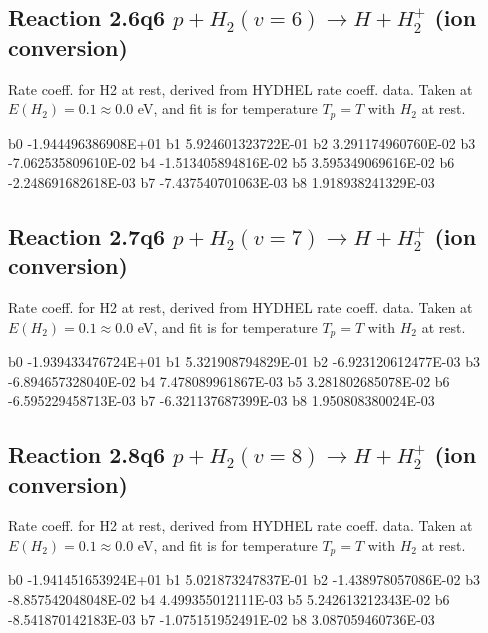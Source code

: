 \newpage
\subsection{
Reaction 2.6q6
$ p + H_2(v=6) \rightarrow H + H_2^+$ (ion conversion)
}
Rate coeff. for H2 at rest, derived from HYDHEL rate coeff. data.
Taken at $E(H_2) = 0.1 \approx 0.0$ eV,  and fit is for temperature $T_p=T$ with $H_2$ at rest.

\begin{{small}}\begin{{verbatim}}

  b0 -1.944496386908E+01  b1  5.924601323722E-01  b2  3.291174960760E-02
  b3 -7.062535809610E-02  b4 -1.513405894816E-02  b5  3.595349069616E-02
  b6 -2.248691682618E-03  b7 -7.437540701063E-03  b8  1.918938241329E-03

\end{{verbatim}}\end{{small}}

\newpage
\subsection{
Reaction 2.7q6
$ p + H_2(v=7) \rightarrow H + H_2^+$ (ion conversion)
}
Rate coeff. for H2 at rest, derived from HYDHEL rate coeff. data.
Taken at $E(H_2) = 0.1 \approx 0.0$ eV,  and fit is for temperature $T_p=T$ with $H_2$ at rest.

\begin{{small}}\begin{{verbatim}}

  b0 -1.939433476724E+01  b1  5.321908794829E-01  b2 -6.923120612477E-03
  b3 -6.894657328040E-02  b4  7.478089961867E-03  b5  3.281802685078E-02
  b6 -6.595229458713E-03  b7 -6.321137687399E-03  b8  1.950808380024E-03

\end{{verbatim}}\end{{small}}

\newpage
\subsection{
Reaction 2.8q6
$ p + H_2(v=8) \rightarrow H + H_2^+$ (ion conversion)
}
Rate coeff. for H2 at rest, derived from HYDHEL rate coeff. data.
Taken at $E(H_2) = 0.1 \approx 0.0$ eV,  and fit is for temperature $T_p=T$ with $H_2$ at rest.

\begin{{small}}\begin{{verbatim}}

  b0 -1.941451653924E+01  b1  5.021873247837E-01  b2 -1.438978057086E-02
  b3 -8.857542048048E-02  b4  4.499355012111E-03  b5  5.242613212343E-02
  b6 -8.541870142183E-03  b7 -1.075151952491E-02  b8  3.087059460736E-03

\end{{verbatim}}\end{{small}}

